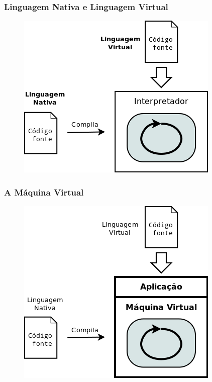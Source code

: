 \documentclass[brazil]{beamer}
\begin{document}
\begin{frame}[fragile]
  \frametitle{Linguagem Nativa e Linguagem Virtual}
  \begin{figure}
    \includegraphics[height=.5\textheight]{images/nativo-vs-virtual-02.png}
  \end{figure}
\end{frame}
\begin{frame}[fragile]
  \frametitle{A Máquina Virtual}
  \begin{figure}
    \includegraphics[height=.6\textheight]{images/nativo-vs-virtual-03.png}
  \end{figure}
\end{frame}
\end{document}

